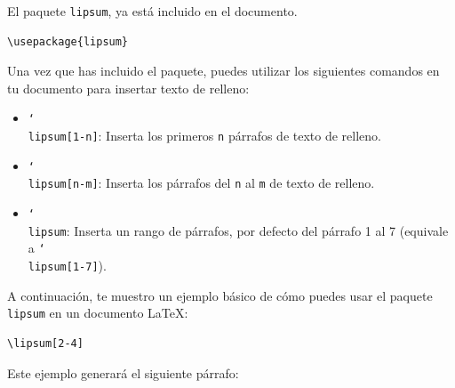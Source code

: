 \documentclass[a4paper,12pt]{report}
\begin{document}
\begin{appendices}
El paquete \texttt{lipsum}, ya está incluido en el documento.

\begin{lstlisting}[language={[LaTeX]TeX},backgroundcolor=\color{gray!10!white}]
\usepackage{lipsum} 
\end{lstlisting}

Una vez que has incluido el paquete, puedes utilizar los siguientes comandos en tu documento para insertar texto de relleno:

\begin{itemize}
  \item \texttt{\char`\\lipsum[1-n]}: Inserta los primeros \texttt{n} párrafos de texto de relleno.
  \item \texttt{\char`\\lipsum[n-m]}: Inserta los párrafos del \texttt{n} al \texttt{m} de texto de relleno.
  \item \texttt{\char`\\lipsum}: Inserta un rango de párrafos, por defecto del párrafo 1 al 7 (equivale a \texttt{\char`\\lipsum[1-7]}).
\end{itemize}

A continuación, te muestro un ejemplo básico de cómo puedes usar el paquete \texttt{lipsum} en un documento \LaTeX{}:

\begin{lstlisting}[language={[LaTeX]TeX},backgroundcolor=\color{gray!10!white}]
\lipsum[2-4] 
\end{lstlisting}
  
Este ejemplo generará el siguiente párrafo:

\lipsum[2-4]

\end{appendices}
\end{document}
